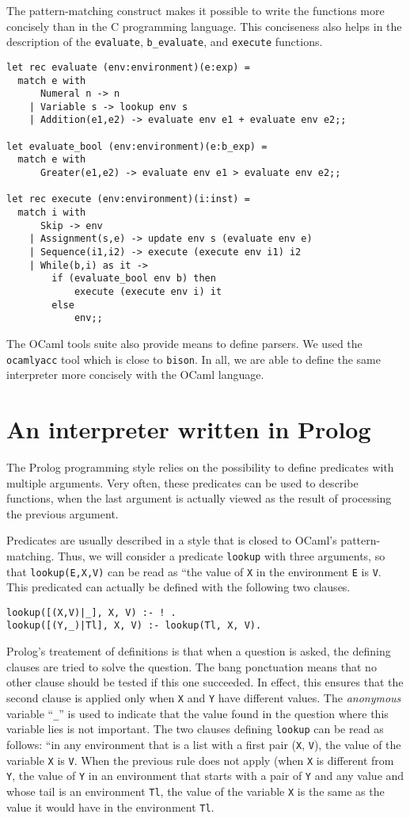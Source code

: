 \documentclass{book}
\begin{document}
The pattern-matching construct makes it possible to write the
functions more concisely than in the C programming language.  This
conciseness also helps in the description of the {\tt evaluate},
{\tt b\_evaluate}, and {\tt execute} functions.
\begin{verbatim}
let rec evaluate (env:environment)(e:exp) =
  match e with
      Numeral n -> n
    | Variable s -> lookup env s
    | Addition(e1,e2) -> evaluate env e1 + evaluate env e2;;

let evaluate_bool (env:environment)(e:b_exp) =
  match e with
      Greater(e1,e2) -> evaluate env e1 > evaluate env e2;;

let rec execute (env:environment)(i:inst) =
  match i with
      Skip -> env
    | Assignment(s,e) -> update env s (evaluate env e)
    | Sequence(i1,i2) -> execute (execute env i1) i2
    | While(b,i) as it ->
        if (evaluate_bool env b) then
            execute (execute env i) it
        else
            env;;
\end{verbatim}
The OCaml tools suite also provide means to define parsers.  We
used the {\tt ocamlyacc} tool which is close to {\tt bison}.  In all,
we are able to define the same interpreter more concisely with the
OCaml language.

\section{An interpreter written in Prolog}
The Prolog programming style relies on the possibility to define
predicates with multiple arguments.  Very often, these predicates
can be used to describe functions, when the last argument is actually
viewed as the result of processing the previous argument.

Predicates are usually described in a style that is closed to OCaml's
pattern-matching.  Thus, we will consider a predicate {\tt lookup}
with three arguments, so that {\tt lookup(E,X,V)} can be read as
``the value of {\tt X} in the environment {\tt E} is {\tt V}.
This predicated can actually be defined with the following two clauses.
\begin{verbatim}
lookup([(X,V)|_], X, V) :- ! .
lookup([(Y,_)|Tl], X, V) :- lookup(Tl, X, V).
\end{verbatim}
Prolog's treatement of definitions is that when a question is asked, the
defining clauses are tried to solve the question.  The bang ponctuation
means that no other clause should be tested if this one succeeded.  In
effect, this ensures that the second clause is applied only when {\tt X}
and {\tt Y} have different values.  The {\em anonymous} variable ``{\tt \_}''
is used to indicate that the value found in the question where this
variable lies is not important.  The two clauses defining {\tt lookup}
can be read as follows: ``in any environment that is a list with
a first pair ({\tt X}, {\tt V}), the value of the variable {\tt X} is {\tt V}.
When the previous rule does not apply (when {\tt X} is different from {\tt Y},
the value of {\tt Y} in an environment that starts with a pair
of {\tt Y} and any value and whose tail is an environment {\tt Tl},
the value of the variable {\tt X} is the same as the value it would
have in the environment {\tt Tl}.
\end{document}
